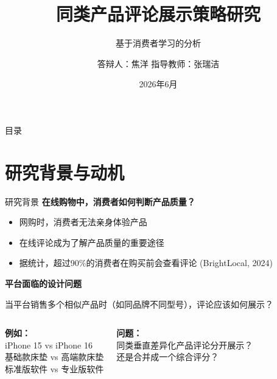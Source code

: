 \documentclass[aspectratio=169,10pt]{beamer}
\title{同类产品评论展示策略研究}
\subtitle{基于消费者学习的分析}
\author{答辩人：焦洋 \quad 指导教师：张瑞洁}
\institute[上科大]{上海科技大学 · 创业与管理学院}
\date{2026年6月}
\newcommand{\pos}[1]{\textcolor{positive}{#1}}
\newcommand{\HL}[1]{\textcolor{emphasis}{#1}}
\begin{document}
\begin{frame}
\titlepage
\end{frame}

\begin{frame}{目录}
\tableofcontents
\end{frame}

\section{研究背景与动机}

\begin{frame}{研究背景}
\textbf{在线购物中，消费者如何判断产品质量？}

\vspace{8pt}
\begin{itemize}
    \item 网购时，消费者\pos{无法亲身体验}产品
    \item \HL{在线评论}成为了解产品质量的重要途径
    \item 据统计，超过90\%的消费者在购买前会查看评论 (BrightLocal, 2024)
\end{itemize}

\vspace{12pt}
\textbf{平台面临的设计问题}

\vspace{6pt}
当平台销售\HL{多个相似产品}时（如同品牌不同型号），评论应该如何展示？

\vspace{8pt}
\begin{columns}[c]
\begin{center}
\textbf{例如：}\\[4pt]
iPhone 15 vs iPhone 16\\
基础款床垫 vs 高端款床垫\\
标准版软件 vs 专业版软件
\end{center}

\begin{center}
\textbf{问题：}\\[4pt]
同类垂直差异化产品评论分开展示？\\
还是合并成一个综合评分？
\end{center}
\end{columns}
\end{frame}
\end{document}
